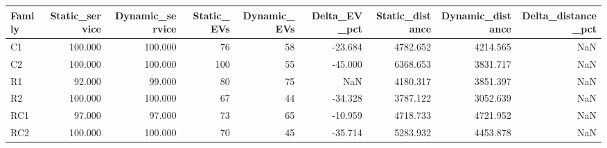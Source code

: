 \begin{tabular}{lrrrrrrrr}
\toprule
Family & Static\_service & Dynamic\_service & Static\_EVs & Dynamic\_EVs & Delta\_EV\_pct & Static\_distance & Dynamic\_distance & Delta\_distance\_pct \\
\midrule
C1 & 100.000 & 100.000 & 76 & 58 & -23.684 & 4782.652 & 4214.565 & NaN \\
C2 & 100.000 & 100.000 & 100 & 55 & -45.000 & 6368.653 & 3831.717 & NaN \\
R1 & 92.000 & 99.000 & 80 & 75 & NaN & 4180.317 & 3851.397 & NaN \\
R2 & 100.000 & 100.000 & 67 & 44 & -34.328 & 3787.122 & 3052.639 & NaN \\
RC1 & 97.000 & 97.000 & 73 & 65 & -10.959 & 4718.733 & 4721.952 & NaN \\
RC2 & 100.000 & 100.000 & 70 & 45 & -35.714 & 5283.932 & 4453.878 & NaN \\
\bottomrule
\end{tabular}
